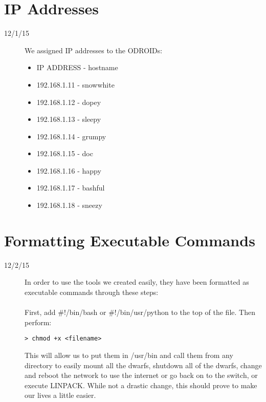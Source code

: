 \section{IP Addresses}
\begin{description}
\item [12/1/15] We assigned IP addresses to the ODROIDs:
\begin{itemize}
	\item IP ADDRESS - hostname
	\item 192.168.1.11 - snow\textunderscore white
	\item 192.168.1.12 - dopey
	\item 192.168.1.13 - sleepy
	\item 192.168.1.14 - grumpy
	\item 192.168.1.15 - doc
	\item 192.168.1.16 - happy
	\item 192.168.1.17 - bashful
	\item 192.168.1.18 - sneezy
\end{itemize}
\end{description}

\section{Formatting Executable Commands}
\begin{description}
\item [12/2/15] In order to use the tools we created easily, they have been formatted as executable commands through these steps: \\ \\
First, add \#!/bin/bash or \#!/bin/usr/python to the top of the file. Then perform:
\begin{lstlisting}
> chmod +x <filename>
\end{lstlisting}
This will allow us to put them in /usr/bin and call them from any directory to easily mount all the dwarfs, shutdown all of the dwarfs, change and reboot the network to use the internet or go back on to the switch, or execute LINPACK. While not a drastic change, this should prove to make our lives a little easier.
\end{description}

